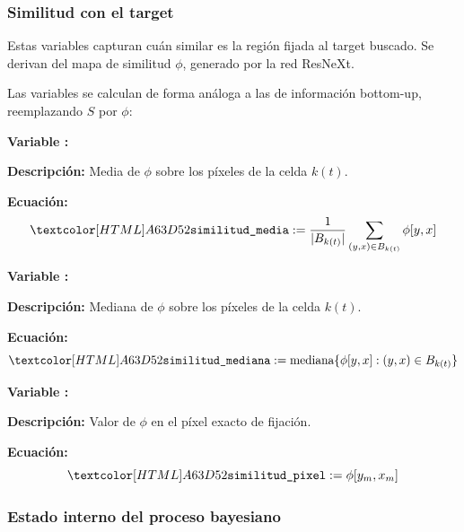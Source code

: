 \subsubsection{Similitud con el target}

Estas variables capturan cuán similar es la región fijada al target buscado.
Se derivan del mapa de similitud $\phi$, generado por la red ResNeXt.

Las variables se
calculan de forma análoga a las de información bottom-up,
reemplazando $S$ por $\phi$:

\begin{featuredef}
\textbf{Variable \thetcbcounter:} 

\textbf{Descripción:} Media de $\phi$ sobre los píxeles de la celda $k(t)$.

\textbf{Ecuación:}
\begin{equation}
    \feat{similitud\_media} := \frac{1}{|B_{k(t)}|}
    \sum_{(y,x) \in B_{k(t)}} \phi[y, x]
\end{equation}
\end{featuredef}

\begin{featuredef}
\textbf{Variable \thetcbcounter:} 

\textbf{Descripción:} Mediana de $\phi$ sobre los píxeles de la celda $k(t)$.

\textbf{Ecuación:}
\begin{equation}
    \feat{similitud\_mediana} := \text{mediana}\{\phi[y, x] : (y, x) \in B_{k(t)}\}
\end{equation}
\end{featuredef}

\begin{featuredef}
\textbf{Variable \thetcbcounter:} 

\textbf{Descripción:} Valor de $\phi$ en el píxel exacto de fijación.

\textbf{Ecuación:}
\begin{equation}
    \feat{similitud\_pixel} := \phi[y_m, x_m]
\end{equation}
\end{featuredef}

\subsubsection{Estado interno del proceso bayesiano}

